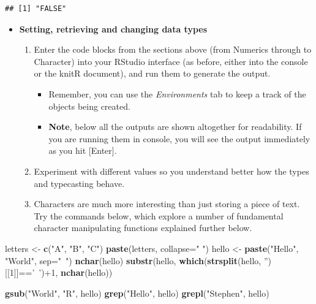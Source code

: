 \documentclass[a4paper]{book}
\newenvironment{Shaded}{\begin{snugshade}}{\end{snugshade}}
\newcommand{\KeywordTok}[1]{\textcolor[rgb]{0.13,0.29,0.53}{\textbf{{#1}}}}
\newcommand{\DataTypeTok}[1]{\textcolor[rgb]{0.13,0.29,0.53}{{#1}}}
\newcommand{\DecValTok}[1]{\textcolor[rgb]{0.00,0.00,0.81}{{#1}}}
\newcommand{\StringTok}[1]{\textcolor[rgb]{0.31,0.60,0.02}{{#1}}}
\newcommand{\NormalTok}[1]{{#1}}
\providecommand{\tightlist}{%
  \setlength{\itemsep}{0pt}\setlength{\parskip}{0pt}}
\renewenvironment{Shaded}
{\vspace{1.5em}\begin{leftbar}\begin{snugshade}}
{\end{snugshade}\end{leftbar}\vspace{3pt}}
\newenvironment{rmdblock}[1]
  {\vspace{1.5em}\begin{shaded*}
  \begin{itemize}
  \renewcommand{\labelitemi}{
    \raisebox{-.7\height}[0pt][0pt]{
      {\setkeys{Gin}{width=3em,keepaspectratio}\texttt{[image: images/\#1]}}
    }
  }
  \item
  }
  {
  \end{itemize}
  \end{shaded*}
  }
\newenvironment{rmdexercise}
  {\begin{rmdblock}{exercise}}
  {\end{rmdblock}}
\begin{document}
\begin{verbatim}
## [1] "FALSE"
\end{verbatim}

\begin{rmdexercise}
\textbf{Setting, retrieving and changing data types}

\begin{enumerate}
\def\labelenumi{\arabic{enumi}.}
\item
  Enter the code blocks from the sections above (from Numerics through
  to Character) into your RStudio interface (as before, either into the
  console or the knitR document), and run them to generate the output.

  \begin{itemize}
  \tightlist
  \item
    Remember, you can use the \emph{Environments} tab to keep a track of
    the objects being created.
  \item
    \textbf{Note}, below all the outputs are shown altogether for
    readability. If you are running them in console, you will see the
    output immediately as you hit {[}Enter{]}.
  \end{itemize}
\item
  Experiment with different values so you understand better how the
  types and typecasting behave.
\item
  Characters are much more interesting than just storing a piece of
  text. Try the commands below, which explore a number of fundamental
  character manipulating functions explained further below.
\end{enumerate}
\end{rmdexercise}

\begin{Shaded}
\begin{Highlighting}[]
\NormalTok{letters <-}\StringTok{ }\KeywordTok{c}\NormalTok{(}\StringTok{"A"}\NormalTok{, }\StringTok{"B"}\NormalTok{, }\StringTok{"C"}\NormalTok{)}
\KeywordTok{paste}\NormalTok{(letters, }\DataTypeTok{collapse=}\StringTok{" "}\NormalTok{)}
\NormalTok{hello <-}\StringTok{ }\KeywordTok{paste}\NormalTok{(}\StringTok{"Hello"}\NormalTok{, }\StringTok{"World"}\NormalTok{, }\DataTypeTok{sep=}\StringTok{"~"}\NormalTok{)}
\KeywordTok{nchar}\NormalTok{(hello)}
\KeywordTok{substr}\NormalTok{(hello, }\KeywordTok{which}\NormalTok{(}\KeywordTok{strsplit}\NormalTok{(hello, }\StringTok{''}\NormalTok{)[[}\DecValTok{1}\NormalTok{]]==}\StringTok{'~'}\NormalTok{)+}\DecValTok{1}\NormalTok{, }\KeywordTok{nchar}\NormalTok{(hello))}

\KeywordTok{gsub}\NormalTok{(}\StringTok{"World"}\NormalTok{, }\StringTok{"R"}\NormalTok{, hello)}
\KeywordTok{grep}\NormalTok{(}\StringTok{"Hello"}\NormalTok{, hello)}
\KeywordTok{grepl}\NormalTok{(}\StringTok{"Stephen"}\NormalTok{, hello)}
\end{Highlighting}
\end{Shaded}
\end{document}
